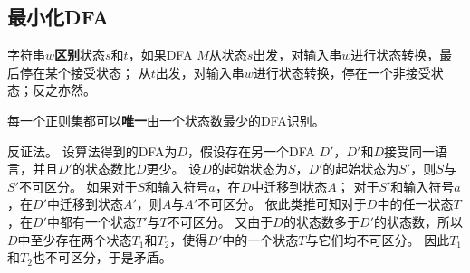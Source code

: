 \subsection{最小化DFA}
\begin{definition}[区别(distinguish)]
字符串$w$\textbf{区别}状态$s$和$t$，如果DFA $M$从状态$s$出发，对输入串$w$进行状态转换，最后停在某个接受状态；
从$t$出发，对输入串$w$进行状态转换，停在一个非接受状态；反之亦然。
\end{definition}

\begin{theorem}
每一个正则集都可以\textbf{唯一}由一个状态数最少的DFA识别。
\end{theorem}
\begin{analysis}
反证法。
设算法得到的DFA为$D$，假设存在另一个DFA $D'$，$D'$和$D$接受同一语言，并且$D'$的状态数比$D$更少。
设$D$的起始状态为$S$，$D'$的起始状态为$S'$，则$S$与$S'$不可区分。
如果对于$S$和输入符号$a$，在$D$中迁移到状态$A$；
对于$S'$和输入符号$a$，在$D'$中迁移到状态$A'$，则$A$与$A'$不可区分。
依此类推可知对于$D$中的任一状态$T$，在$D'$中都有一个状态$T'$与$T$不可区分。
又由于$D$的状态数多于$D'$的状态数，所以$D$中至少存在两个状态$T_1$和$T_2$，使得$D'$中的一个状态$T$与它们均不可区分。
因此$T_1$和$T_2$也不可区分，于是矛盾。
\end{analysis}

